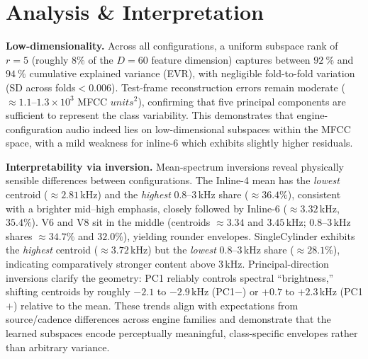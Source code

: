 \documentclass[11pt]{article}
\begin{document}
\section{Analysis \& Interpretation}

\textbf{Low-dimensionality.}  
Across all configurations, a uniform subspace rank of $r=5$ (roughly $8\%$ of the $D=60$ feature dimension) captures between $\SI{92}{\percent}$ and $\SI{94}{\percent}$ cumulative explained variance (EVR), with negligible fold-to-fold variation (SD across folds$ < 0.006$). Test-frame reconstruction errors remain moderate ($\approx 1.1$–$1.3\times10^3$ MFCC $units^2$), confirming that five principal components are sufficient to represent the class variability. This demonstrates that engine-configuration audio indeed lies on low-dimensional subspaces within the MFCC space, with a mild weakness for inline-6 which exhibits slightly higher residuals.

\textbf{Interpretability via inversion.}
Mean-spectrum inversions reveal physically sensible differences between configurations. The Inline-4 mean has the \emph{lowest} centroid ($\approx 2.81$\,kHz) and the \emph{highest} 0.8--3\,kHz share ($\approx 36.4\%$), consistent with a brighter mid--high emphasis, closely followed by Inline-6 ($\approx 3.32$\,kHz, $35.4\%$). V6 and V8 sit in the middle (centroids $\approx 3.34$ and $3.45$\,kHz; 0.8--3\,kHz shares $\approx 34.7\%$ and $32.0\%$), yielding rounder envelopes. Single\text{-}Cylinder exhibits the \emph{highest} centroid ($\approx 3.72$\,kHz) but the \emph{lowest} 0.8--3\,kHz share ($\approx 28.1\%$), indicating comparatively stronger content above 3\,kHz. Principal-direction inversions clarify the geometry: PC1 reliably controls spectral ``brightness,'' shifting centroids by roughly $-2.1$ to $-2.9$\,kHz (PC1$-$) or $+0.7$ to $+2.3$\,kHz (PC1$+$) relative to the mean. These trends align with expectations from source/cadence differences across engine families and demonstrate that the learned subspaces encode perceptually meaningful, class-specific envelopes rather than arbitrary variance.


\end{document}
